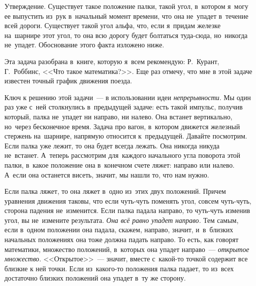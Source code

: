 
Утверждение. Существует такое положение палки, такой угол, в~котором я~могу ее выпустить из~рук
в~начальный момент времени, что она не~упадет в~течение всей дороги. Существует такой угол альфа,
что, если я~придам железке на~шарнире этот угол, то она всю дорогу будет болтаться туда-сюда,
но~никогда не~упадет. Обоснование этого факта изложено ниже.

Эта задача разобрана в~книге, которую я~всем рекомендую: Р.~Курант, Г.~Роббинс, <<Что такое
математика?>>.
Еще раз отмечу, что мне в этой задаче известен точный график движения поезда.


Ключ к решению этой задачи~--- в использовании идеи \textit{непрерывности}. Мы один раз уже с~ней
столкнулись в~предыдущей задаче: есть такой импульс, получив который, палка не~упадет ни направо,
ни налево. Она встанет вертикально, но~через бесконечное время. Задача про вагон, в~котором
движется железный стержень на~шарнире, напрямую относится к~предыдущей. Давайте посмотрим. Если
палка уже лежит, то она будет всегда лежать. Она никогда никуда не~встанет. А~теперь рассмотрим
для~каждого начального угла поворота этой палки, в~какое положение она в~конечном счете ляжет:
направо или налево. А~если она останется висеть, значит, мы нашли то, что нам нужно.

Если палка ляжет, то она ляжет в~одно из~этих двух положений. Причем уравнения движения таковы, что
если чуть-чуть поменять угол, совсем чуть-чуть, сторона падения не~изменится. Если палка падала
направо, то чуть-чуть изменив угол, вы не~измените результата. \textit{Она всё равно упадет направо.} Тем
самым, если в~одном положении она падала, скажем, направо, значит, и~в~близких начальных положениях она тоже должна падать направо.
 То есть, как говорят математики, множество положений, в~которых она упадет
направо~--- \textit{открытое множество}. <<Открытое>>~--- значит, вместе с~какой-то точкой содержит все
близкие к ней точки.
 Если из~какого-то положения палка падает, то из~всех достаточно близких положений
она упадет в~ту же сторону.

